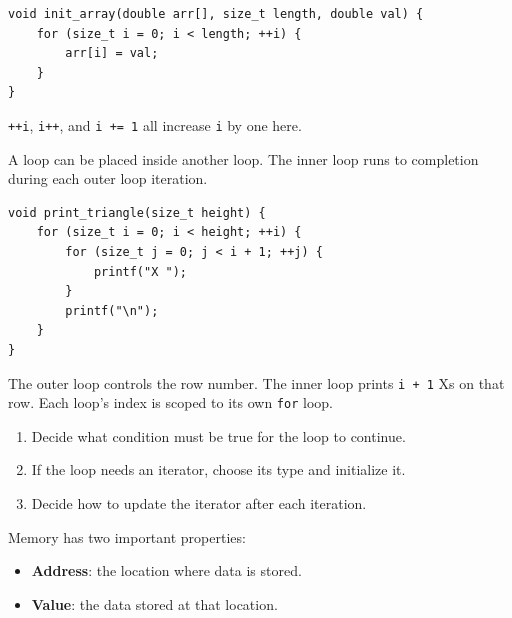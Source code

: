 \documentclass[11pt,a4paper]{article}
\providecommand{\tightlist}{\setlength{\itemsep}{0pt}\setlength{\parskip}{0pt}}
\begin{document}
\label{44-examples}
\hypertarget{44-examples}{}

\label{initialize-every-array-element}
\hypertarget{initialize-every-array-element}{}

\begin{lstlisting}[style=cscode]
void init_array(double arr[], size_t length, double val) {
    for (size_t i = 0; i < length; ++i) {
        arr[i] = val;
    }
}
\end{lstlisting}

\texttt{++i}, \texttt{i++}, and \texttt{i\ +=\ 1} all increase \texttt{i} by one here.

\label{nested-loops-print-a-triangle}
\hypertarget{nested-loops-print-a-triangle}{}

A loop can be placed inside another loop. The inner loop runs to completion during each outer loop iteration.

\begin{lstlisting}[style=cscode]
void print_triangle(size_t height) {
    for (size_t i = 0; i < height; ++i) {
        for (size_t j = 0; j < i + 1; ++j) {
            printf("X ");
        }
        printf("\n");
    }
}
\end{lstlisting}

The outer loop controls the row number. The inner loop prints \texttt{i\ +\ 1} Xs on that row. Each loop's index is scoped to its own \texttt{for} loop.

\label{a-method-for-planning-loops}
\hypertarget{a-method-for-planning-loops}{}

\begin{enumerate}
\def\labelenumi{\arabic{enumi}.}
\tightlist
\item
  Decide what condition must be true for the loop to continue.
\item
  If the loop needs an iterator, choose its type and initialize it.
\item
  Decide how to update the iterator after each iteration.
\end{enumerate}




Memory has two important properties:
\begin{itemize}
    \item \textbf{Address}: the location where data is stored.
    \item \textbf{Value}: the data stored at that location.
\end{itemize}
\end{document}
